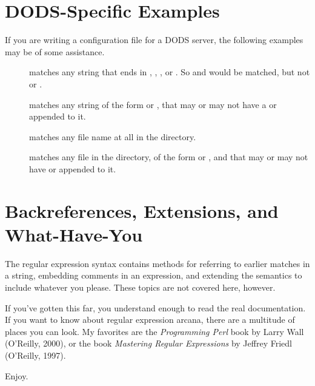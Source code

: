 \documentclass{dods-book}
\begin{document}
\chapter{DODS-Specific Examples}

If you are writing a configuration file for a DODS server, the
following examples may be of some assistance.

\begin{description}

\item[]  matches any string that ends in
  , , , or .  So  and
   would be matched, but not  or
  .

\item[]  matches any string of the
  form  or , that may or may not have a
   or  appended to it.

\item[]  matches any file name at all in the
   directory.

\item[] matches any
  file in the  directory, of the form  or
  , and that may or may not have  or 
  appended to it.

\end{description}


\chapter{Backreferences, Extensions, and What-Have-You}
\label{elsewhere}

The regular expression syntax contains methods for referring to
earlier matches in a string, embedding comments in an expression, and
extending the semantics to include whatever you please.  These topics
are not covered here, however.

If you've gotten this far, you understand enough to read the real
documentation.  If you want to know about regular expression arcana,
there are a multitude of places you can look.  My favorites are the
\emph{Programming Perl} book by Larry Wall (O'Reilly, 2000), or the
book \emph{Mastering Regular Expressions} by Jeffrey Friedl (O'Reilly,
1997).

Enjoy.

\end{document}
